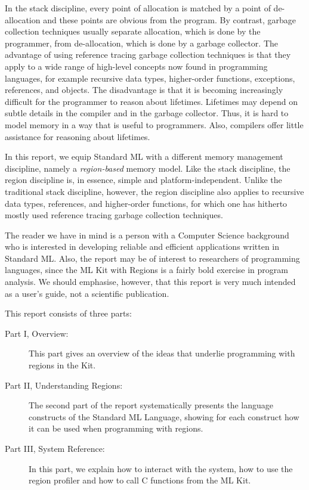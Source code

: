 \documentclass[12pt]{book}
\begin{document}
In the stack discipline, every point of allocation is matched by a
point of de-allocation and these points are obvious from the
program. By contrast, garbage collection techniques usually separate
allocation, which is done by the programmer, from de-allocation, which
is done by a garbage collector.  The advantage of using reference
tracing 
%
garbage collection techniques is that they apply to a wide range of
high-level concepts now found in programming languages, for example
recursive data types, higher-order functions, exceptions, references,
and objects. The disadvantage is that it is becoming increasingly
difficult for the programmer to reason about lifetimes. Lifetimes may
depend on subtle details in the compiler and in the garbage collector.
Thus, it is hard to model memory in a way that is useful to
programmers. Also, compilers offer little assistance for reasoning
about lifetimes.

In this report, we equip Standard ML with a different memory
management discipline, namely a {\em region-based} memory model.  Like
the stack discipline, the region discipline is, in essence, simple and
platform-independent. Unlike the traditional stack discipline,
however, the region discipline also applies to recursive data types,
references, and higher-order functions, for which one has hitherto
mostly used reference tracing garbage collection techniques.

The reader we have in mind is a person with a Computer Science
background who is interested in developing reliable and efficient
applications written in Standard ML. Also, the report may be of
interest to researchers of programming languages, since the ML Kit
with Regions is a fairly bold exercise in program analysis. We should
emphasise, however, that this report is very much intended as a user's
guide, not a scientific publication.

This report consists of three parts:
\begin{description}
\item[Part I, Overview:] This part gives an overview of the ideas
  that underlie programming with regions in the Kit.
\item[Part II, Understanding Regions:] The second part of the report
  systematically presents the language constructs of the Standard ML
  Language, showing for each construct how it can be used when
  programming with regions.
\item[Part III, System Reference:] In this part, we explain how to
  interact with the system, how to use the region profiler and how to
  call C functions from the ML Kit.
\end{description}
\end{document}
